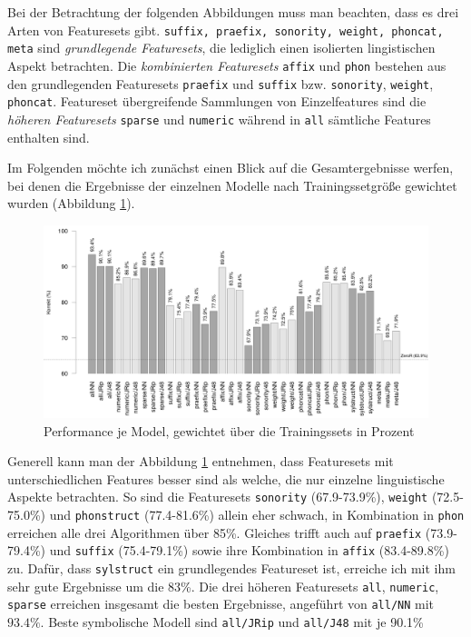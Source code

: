 Bei der Betrachtung der folgenden Abbildungen muss man beachten, dass es drei Arten von Featuresets gibt. \texttt{suffix, praefix, sonority, weight, phoncat, meta} sind \textit{grundlegende Featuresets}, die lediglich einen isolierten lingistischen Aspekt betrachten.
Die \textit{kombinierten Featuresets} \texttt{affix} und \texttt{phon} bestehen aus den grundlegenden Featuresets \texttt{praefix} und \texttt{suffix} bzw. \texttt{sonority}, \texttt{weight}, \texttt{phoncat}.
Featureset übergreifende Sammlungen von Einzelfeatures sind die \textit{höheren Featuresets} \texttt{sparse} und \texttt{numeric} während in \texttt{all} sämtliche Features enthalten sind.

Im Folgenden möchte ich zunächst einen Blick auf die Gesamtergebnisse werfen, bei denen die Ergebnisse der einzelnen Modelle nach Trainingssetgröße gewichtet wurden (Abbildung \ref{fig:overall_weighted}). 

\begin{figure}[h]
    \centering
    \caption{Performance je Model, gewichtet über die Trainingssets in Prozent}
    \label{fig:overall_weighted}
    \includegraphics[width=\columnwidth]{figures/esemble/weighted_performance.png}
\end{figure}

Generell kann man der Abbildung \ref{fig:overall_weighted} entnehmen, dass Featuresets mit unterschiedlichen Features besser sind als welche, die nur einzelne linguistische Aspekte betrachten. So sind die Featuresets \texttt{sonority} (67.9-73.9\%), \texttt{weight} (72.5-75.0\%) und \texttt{phonstruct} (77.4-81.6\%) allein eher schwach, in Kombination in \texttt{phon} erreichen alle drei Algorithmen über 85\%. Gleiches trifft auch auf \texttt{praefix} (73.9-79.4\%) und \texttt{suffix} (75.4-79.1\%) sowie ihre Kombination in \texttt{affix} (83.4-89.8\%) zu. Dafür, dass \texttt{sylstruct} ein grundlegendes Featureset ist, erreiche ich mit ihm sehr gute Ergebnisse um die 83\%.  Die drei höheren Featuresets \texttt{all}, \texttt{numeric}, \texttt{sparse} erreichen insgesamt die besten Ergebnisse, angeführt von \texttt{all/NN} mit $93.4\%$. Beste symbolische Modell sind \texttt{all/JRip} und \texttt{all/J48} mit je 90.1\%\\

